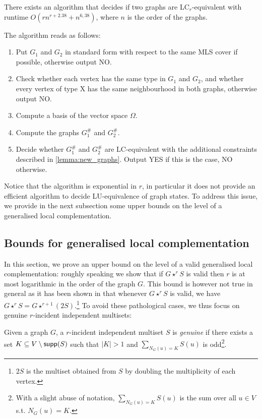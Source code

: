 \documentclass[a4paper,UKenglish,cleveref,autoref,thm-restate]{arxiv}
\newcommand{\se}{\subseteq}
\newcommand{\sm}{\setminus}
\newcommand{\supp}{\textup{\textsf{supp}}}
\begin{document}
\begin{theorem} \label{thm:algolcr}
    There exists an algorithm that decides if two graphs are LC$_r$-equivalent with runtime $O(r n^{r+2.38} + n^{6,38})$, where $n$ is the order of the graphs.
\end{theorem}

The algorithm reads as follows:
\begin{enumerate}
    \item Put $G_1$ and $G_2$ in standard form with respect to the same MLS cover if possible, otherwise output NO.
    \item Check whether each vertex has the same type in $G_1$ and $G_2$, and whether every vertex of type X has the same neighbourhood in both graphs, otherwise output NO.
    \item Compute a basis of the vector space $\Omega$.
    \item Compute the graphs ${G}^{\#}_1$ and ${G}^{\#}_2$.
    \item Decide whether ${G}^{\#}_1$ and ${G}^{\#}_2$ are LC-equivalent with the additional constraints described in \cref{lemma:new_graphs}. Output YES if this is the case,  NO otherwise.
\end{enumerate}


Notice that the algorithm is exponential in $r$, in particular it does not provide an efficient algorithm to decide LU-equivalence of graph states. To address this issue, we provide in the next subsection some upper bounds on the level of a generalised local complementation.


\subsection{Bounds for generalised local complementation} \label{subsec:bounds}


In this section, we prove an upper bound on the level of a valid generalised local complementation: roughly speaking we show that if $G\star^r S$ is valid then $r$ is at most logarithmic in the order of the graph $G$. This bound is however not true in general as it has been shown in \cite{claudet2024local} that whenever $G\star^r S$ is valid, we have $G\star^r S = G\star^{r+1} (2S)$.\footnote{$2S$  is the multiset obtained from $S$ by doubling the multiplicity of each vertex.} To avoid these pathological cases, we thus focus on genuine $r$-incident independent multisets:


\begin{definition}
Given a graph $G$, a $r$-incident independent multiset $S$ is \emph{genuine} if there exists a set $K \se V \sm \supp(S)$ such that $|K|>1$ and $\sum_{N_{G}(u)=K}S(u)$ is odd\footnote{With a slight abuse of notation, $\sum_{N_{G}(u)=K}S(u)$ is the sum over all $u\in V$ s.t. $N_{G}(u)=K$.}. 
\end{definition}
\end{document}
